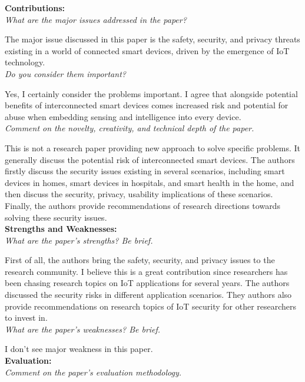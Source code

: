 \documentclass[11pt, oneside]{article}   	%
\begin{document}
\noindent \textbf{Contributions:}\\
\emph{What are the major issues addressed in the paper?}

The major issue discussed in this paper is the safety, security, and privacy threats existing in a world of connected smart devices, driven by the emergence of IoT technology. \\


\noindent \emph{Do you consider them important?}

Yes, I certainly consider the problems important. I agree that alongside potential benefits of interconnected smart devices comes increased risk and potential for abuse when embedding sensing and intelligence into every device.\\


\noindent \emph{Comment on the novelty, creativity, and technical depth of the paper.}

This is not a research paper providing new approach to solve specific problems. It generally discuss the potential risk of interconnected smart devices. The authors firstly discuss the security issues existing in several scenarios, including smart devices in homes, smart devices in hospitals, and smart health in the home, and then discuss the security, privacy, usability implications of these scenarios. Finally, the authors provide recommendations of research directions towards solving these security issues.\\



\noindent \textbf{Strengths and Weaknesses:}\\
\emph{What are the paper’s strengths? Be brief.}

First of all, the authors bring the safety, security, and privacy issues to the research community. I believe this is a great contribution since researchers has been chasing research topics on IoT applications for several years. The authors discussed the security risks in different application scenarios. They authors also provide recommendations on research topics of IoT security for other researchers to invest in.\\


\newpage
\noindent \emph{What are the paper's weaknesses? Be brief.}

I don't see major weakness in this paper. \\


\noindent \textbf{Evaluation:}\\
\emph{Comment on the paper's evaluation methodology.}
\end{document}
